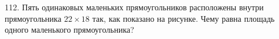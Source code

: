 112. Пять одинаковых маленьких прямоугольников расположены внутри прямоугольника $22\times18$ так, как показано на рисунке. Чему равна площадь одного маленького прямоугольника?\\
\begin{figure}[ht!]
\end{figure}\\
